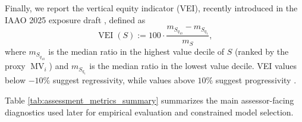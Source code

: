 \documentclass{article}
\theoremstyle{plain}
\theoremstyle{definition}
\newcommand{\1}{\mathbf{1}}
\begin{document}
Finally, we report the vertical equity indicator (VEI), recently introduced in the IAAO 2025 exposure draft \cite{IAAO2025ExposureRatio}, defined as
\begin{equation}
\label{eq:vei}
\operatorname{VEI}(S)
:=
100\cdot\frac{m_{S_{q_{10}}}-m_{S_{q_1}}}{m_S},
\end{equation}
where $m_{S_{q_{10}}}$ is the median ratio in the highest value decile of $S$ (ranked by the proxy $\operatorname{MV}_i$) and $m_{S_{q_1}}$ is the median ratio in the lowest value decile. VEI values below $-10\%$ suggest regressivity, while values above $10\%$ suggest progressivity \cite{IAAO2025ExposureRatio}.

Table \ref{tab:assessment_metrics_summary} summarizes the main assessor-facing diagnostics used later for empirical evaluation and constrained model selection.
\end{document}
